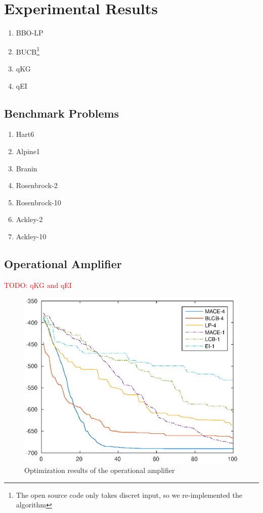 \section{Experimental Results}

\begin{enumerate}
        \item BBO-LP
        \item BUCB\footnote{The open source code only takes discret input, so we re-implemented the algorithm}
        \item qKG
        \item qEI
\end{enumerate}



\subsection{Benchmark Problems}

\begin{enumerate}
        \item Hart6
        \item Alpine1
        \item Branin
        \item Rosenbrock-2
        \item Rosenbrock-10
        \item Ackley-2
        \item Ackley-10
\end{enumerate}

\subsection{Operational Amplifier}

\textcolor{red}{TODO: qKG and qEI}

\begin{figure}[htbp]
\vskip 0.2in
\begin{center}
\centerline{\includegraphics[width=\columnwidth]{./img/mean_DAC2014.eps}}
\caption{Optimization results of the operational amplifier}
\label{resDAC2014}
\end{center}
\vskip -0.2in
\end{figure}


